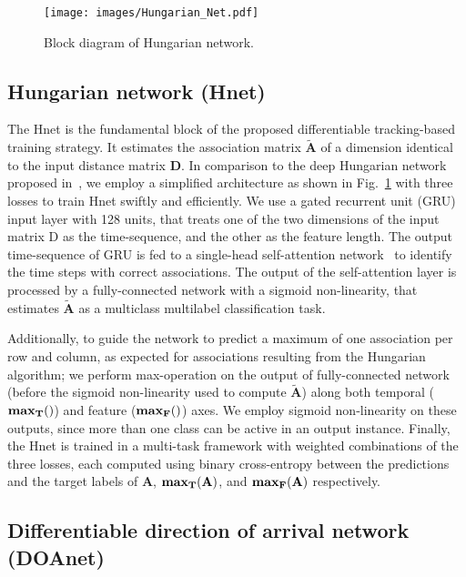 \documentclass[conference]{IEEEtran}
\def\D {\mathbf{D}}
\def\A {\mathbf{A}}
\def\tA {\tilde{\mathbf{A}}}
\begin{document}
\begin{figure}[!tp]
\centerline{\texttt{[image: images/Hungarian\_Net.pdf]}}
\vspace{-10pt}
\caption{Block diagram of Hungarian network.}
\label{fig:hnet}
\vspace{-10pt}
\end{figure}



\subsection{Hungarian network (Hnet)}
\label{sec:hnet}

The Hnet is the fundamental block of the proposed differentiable tracking-based training strategy. It estimates the association matrix $\tA$ of a dimension identical to the input distance matrix $\D$. In comparison to the deep Hungarian network proposed in~\cite{xu2020train}, we employ a simplified architecture as shown in Fig.~\ref{fig:hnet} with three losses to train Hnet swiftly and efficiently. We use a gated recurrent unit (GRU) input layer with 128 units, that treats one of the two dimensions of the input matrix D as the time-sequence, and the other as the feature length. The output time-sequence of GRU is fed to a single-head self-attention network~\cite{vaswani2017attention} to identify the time steps with correct associations. The output of the self-attention layer is processed by a fully-connected network with a sigmoid non-linearity, that estimates $\tA$ as a multiclass multilabel classification task. 

Additionally, to guide the network to predict a maximum of one association per row and column, as expected for associations resulting from the Hungarian algorithm; we perform max-operation on the output of fully-connected network (before the sigmoid non-linearity used to compute $\tA$) along both temporal ($\bf{max_T()}$) and feature ($\bf{max_F()}$) axes. We employ sigmoid non-linearity on these outputs, since more than one class can be active in an output instance. Finally, the Hnet is trained in a multi-task framework with weighted combinations of the three losses, each computed using binary cross-entropy between the predictions and the target labels of $\A$, $\bf{max_T(\A)}$, and $\bf{max_F(\A)}$ respectively. 


\subsection{Differentiable direction of arrival network (DOAnet)}
\label{sec:doanet}
\end{document}
